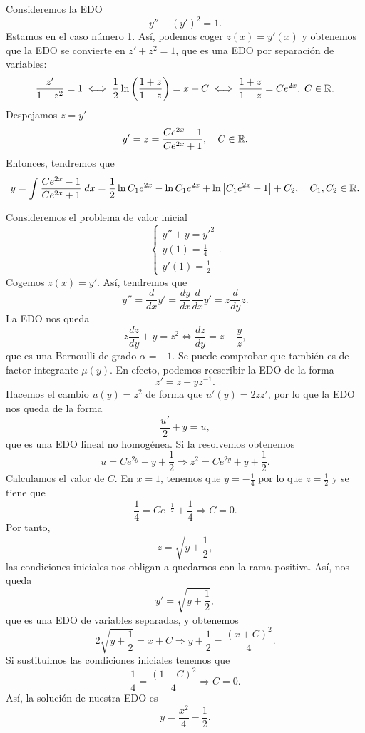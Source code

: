 \begin{eg}
	Consideremos la EDO
	\[y'' + \left(y'\right)^{2}= 1 .\]
Estamos en el caso número 1. Así, podemos coger $\displaystyle z\left(x\right)=y'\left(x\right) $ y obtenemos que la EDO se convierte en $\displaystyle z' + z^{2}=1 $, que es una EDO por separación de variables:
\[\frac{z'}{1-z^{2}}=1 \iff \frac{1}{2}\ln \left(\frac{1+z}{1-z}\right)=x+C \iff \frac{1+z}{1-z}=Ce^{2x}, \; C \in \mathbb{R} .\]
Despejamos $\displaystyle z = y' $ 
\[y' =z = \frac{Ce^{2x}-1}{Ce^{2x}+1}, \quad C \in \mathbb{R} .\]
Entonces, tendremos que 
\[y = \int \frac{Ce^{2x}-1}{Ce^{2x}+1} \; dx = \frac{1}{2}\ln C_{1}e^{2x} - \ln C_{1}e^{2x} + \ln \left|C_{1}e^{2x}+1\right|+C_{2}, \quad C_{1}, C_{2} \in \mathbb{R} .\]
\end{eg}
\begin{eg}
Consideremos el problema de valor inicial
\[
\begin{cases}
y'' +y=y'^{2} \\
y\left(1\right)=\frac{1}{4} \\
y'\left(1\right)=\frac{1}{2}
\end{cases}
.\]
Cogemos $\displaystyle z\left(x\right)=y' $. Así, tendremos que 
\[y'' = \frac{d}{dx}y' = \frac{dy}{dx}\frac{d}{dx}y' = z\frac{d}{dy}z .\]
La EDO nos queda
\[z\frac{dz}{dy} +y=z^{2} \iff \frac{dz}{dy} = z - \frac{y}{z},\]
que es una Bernoulli de grado $\displaystyle \alpha = -1 $. Se puede comprobar que también es de factor integrante $\displaystyle \mu\left(y\right) $.  En efecto, podemos reescribir la EDO de la forma
\[z' = z-yz^{-1} .\]
Hacemos el cambio $\displaystyle u\left(y\right)=z^{2} $ de forma que $\displaystyle u'\left(y\right)=2zz' $, por lo que la EDO nos queda de la forma
\[\frac{u'}{2}+y=u ,\]
que es una EDO lineal no homogénea. Si la resolvemos obtenemos
\[u = Ce^{2y}+y+\frac{1}{2} \Rightarrow z^{2} = Ce^{2y}+y+\frac{1}{2} .\]
Calculamos el valor de $\displaystyle C $. En $\displaystyle x = 1 $, tenemos que $\displaystyle y = -\frac{1}{4} $ por lo que $\displaystyle z = \frac{1}{2} $ y se tiene que 
\[\frac{1}{4}=Ce^{-\frac{1}{2}}+\frac{1}{4}\Rightarrow C = 0 .\]
Por tanto, 
\[z = \sqrt{y + \frac{1}{2}} ,\]
las condiciones iniciales nos obligan a quedarnos con la rama positiva. Así, nos queda
\[y' = \sqrt{y + \frac{1}{2}} ,\]
que es una EDO de variables separadas, y obtenemos
\[2\sqrt{y + \frac{1}{2}} = x + C \Rightarrow y + \frac{1}{2} = \frac{\left(x+C\right)^{2}}{4} .\]
Si sustituimos las condiciones iniciales tenemos que 
\[\frac{1}{4} = \frac{\left(1 + C\right)^{2}}{4} \Rightarrow C = 0 .\]
Así, la solución de nuestra EDO es
\[y = \frac{x^{2}}{4}-\frac{1}{2} .\]
\end{eg}
